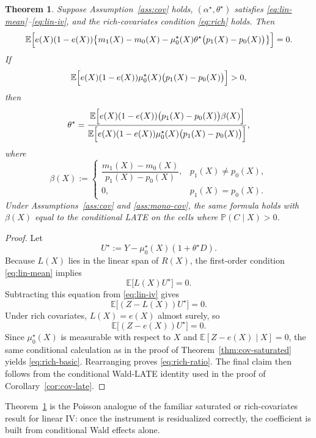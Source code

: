 \documentclass[11pt]{article}
\numberwithin{equation}{section}
\newcommand{\E}{\mathbb E}
\newcommand{\PP}{\mathbb P}
\newcommand{\1}{\mathbf 1}
\newtheorem{theorem}[assumption]{Theorem}
\theoremstyle{remark}
\begin{document}
\begin{theorem}\label{thm:rich-covariates}
Suppose Assumption~\ref{ass:cov} holds, $(\alpha^\star,\theta^\star)$ satisfies
\eqref{eq:lin-mean}--\eqref{eq:lin-iv}, and the rich-covariates condition
\eqref{eq:rich} holds. Then
\begin{equation}\label{eq:rich-basic}
\E\Bigl[e(X)(1-e(X))\bigl\{m_1(X)-m_0(X)-\mu_0^\star(X)\theta^\star
\bigl(p_1(X)-p_0(X)\bigr)\bigr\}\Bigr] = 0.
\end{equation}
If
\[
\E\Bigl[e(X)(1-e(X))\mu_0^\star(X)\bigl(p_1(X)-p_0(X)\bigr)\Bigr] > 0,
\]
then
\begin{equation}\label{eq:rich-ratio}
\theta^\star
= \frac{\E\Bigl[e(X)(1-e(X))\bigl(p_1(X)-p_0(X)\bigr)\beta(X)\Bigr]}
{\E\Bigl[e(X)(1-e(X))\mu_0^\star(X)\bigl(p_1(X)-p_0(X)\bigr)\Bigr]},
\end{equation}
where
\[
\beta(X) :=
\begin{cases}
\dfrac{m_1(X)-m_0(X)}{p_1(X)-p_0(X)}, & p_1(X)\neq p_0(X),\\[1.25ex]
0, & p_1(X)=p_0(X).
\end{cases}
\]
Under Assumptions~\ref{ass:cov} and \ref{ass:mono-cov}, the same formula holds with
$\beta(X)$ equal to the conditional LATE on the cells where $\PP(C\mid X)>0$.
\end{theorem}

\begin{proof}
Let
\[
U^\star := Y-\mu_0^\star(X)(1+\theta^\star D).
\]
Because $L(X)$ lies in the linear span of $R(X)$, the first-order condition
\eqref{eq:lin-mean} implies
\[
\E\bigl[L(X)U^\star\bigr] = 0.
\]
Subtracting this equation from \eqref{eq:lin-iv} gives
\[
\E\bigl[(Z-L(X))U^\star\bigr] = 0.
\]
Under rich covariates, $L(X)=e(X)$ almost surely, so
\[
\E\bigl[(Z-e(X))U^\star\bigr] = 0.
\]
Since $\mu_0^\star(X)$ is measurable with respect to $X$ and
$\E[Z-e(X)\mid X]=0$, the same conditional calculation as in the proof of
Theorem~\ref{thm:cov-saturated} yields
\eqref{eq:rich-basic}. Rearranging proves \eqref{eq:rich-ratio}. The final claim then
follows from the conditional Wald-LATE identity used in the proof of
Corollary~\ref{cor:cov-late}.
\end{proof}

Theorem~\ref{thm:rich-covariates} is the Poisson analogue of the familiar saturated or
rich-covariates result for linear IV: once the instrument is residualized correctly, the
coefficient is built from conditional Wald effects alone.
\end{document}
